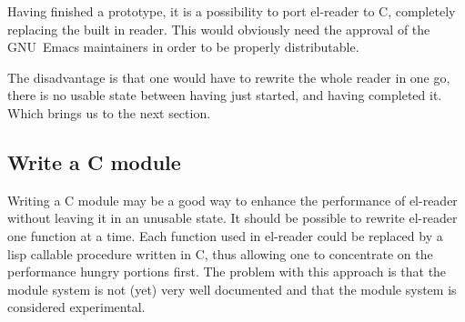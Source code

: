 \documentclass[a4paper,10pt,twoside]{report}
\newcommand{\cl}{Common Lisp}
\newcommand{\elr}{el-reader}
\newcommand{\fun}[1]{\texttt{#1}}
\newcommand{\emacs}{GNU~Emacs}
\begin{document}
Having finished a prototype, it is a possibility to port \elr{} to C, completely
replacing the built in reader.  This would obviously need the approval of the
\emacs{} maintainers in order to be properly distributable.

The disadvantage is that one would have to rewrite the whole reader in one go,
there is no usable state between having just started, and having completed it.
Which brings us to the next section.

\subsection{Write a C module}
\label{subsec:C-module}

Writing a C module may be a good way to enhance the performance of \elr{}
without leaving it in an unusable state.  It should be possible to rewrite
\elr{} one function at a time.  Each function used in \elr{} could be replaced
by a lisp callable procedure written in C, thus allowing one to concentrate on
the performance hungry portions first.  The problem with this approach is that
the module system is not (yet) very well documented and that the module system
is considered experimental.





\vfill
\pagebreak


\end{document}
